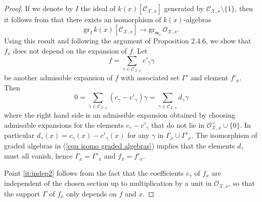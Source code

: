 \documentclass{amsart}%
\numberwithin{equation}{subsection}
\theoremstyle{plain2}
\theoremstyle{definition2}
\theoremstyle{stepstyle}
\theoremstyle{point}
\theoremstyle{subpoint}
\newcommand{\cX}{\ensuremath{\mathscr{X}}}
\newcommand{\caO}{\ensuremath{\mathcal{O}}}
\begin{document}
\begin{proof}
If we denote by $I$ the ideal of $k(x)[\mathcal{C}_{\cX,x}]$ generated by $\mathcal{C}_{\cX,x}\setminus \{1\}$, then it follows from \cite{Kato1994a} that there exists an isomorphism of $k(x)$-algebras \begin{equation} \label{equ isomo graded algebras}
\mathrm{gr}_I \,k(x)[\mathcal{C}_{\cX,x}]\to \mathrm{gr}_{\mathfrak{m}_x}\, \mathcal{O}_{\cX,x}.
\end{equation}
Using this result and following the argument of  \cite{MustataNicaise} Proposition 2.4.6, we show that $f_x$ does not depend on the expansion of $f$. Let $$f=\sum_{\gamma \in \mathcal{C}_{\cX,x}}c'_{\gamma}\gamma$$ be another admissible expansion of $f$ with associated set $\Gamma'$ and element $f'_x$. Then $$0=\sum_{\gamma \in \mathcal{C}_{\cX,x}}(c_{\gamma}- c'_\gamma)\gamma =\sum_{\gamma \in \mathcal{C}_{\cX,x}}d_{\gamma}\gamma$$ where the right hand side is an admissible expansion obtained by choosing admissible expansions for the elements $c_\gamma-c'_\gamma$ that do not lie in $\caO_{\cX,x}^\times \cup \{0\}$. In particular $d_\gamma(x)= c_\gamma(x)-c'_\gamma(x)$ for any $\gamma$ in $ \Gamma_x \cup \Gamma'_x$. The isomorphism of graded algebras in (\ref{equ isomo graded algebras}) implies that the elements $d_\gamma$ must all vanish, hence $\Gamma_x = \Gamma'_x$ and $f_x=f'_x$.  

Point \eqref{it:indep2} follows from the fact that the coefficients $c_\gamma$ of $f_x$ are independent of the chosen section up to multiplication by a unit in $\mathcal{O}_{\cX,x}$, so that the support $\Gamma$ of $f_x$ only depends on $f$ and $x$.
\end{proof}
\end{document}

